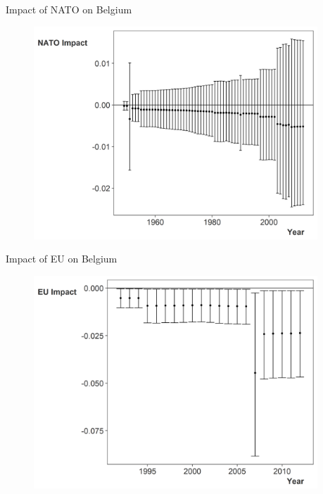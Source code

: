 \documentclass[12pt]{beamer}
\begin{document}

\begin{frame}{Impact of NATO on Belgium}


\begin{figure}
	\centering
		\includegraphics[width=0.95\textwidth]{bel-nato-imp.png}
\end{figure}


\end{frame}



\begin{frame}{Impact of EU on Belgium}


\begin{figure}
	\centering
		\includegraphics[width=0.95\textwidth]{bel-eu-imp.png}
\end{figure}


\end{frame}
\end{document}
